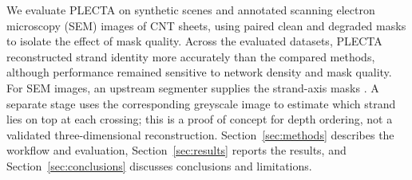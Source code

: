 We evaluate PLECTA on synthetic scenes and annotated scanning electron
microscopy (SEM) images of CNT sheets, using paired clean and degraded masks
to isolate the effect of mask quality. Across the evaluated datasets, PLECTA
reconstructed strand identity more accurately than the compared methods,
although performance remained sensitive to network density and mask quality.
For SEM images, an upstream segmenter supplies the strand-axis masks
\citep{ruehle2021workflow}. A separate stage uses the corresponding greyscale
image to estimate which strand lies on top at each crossing; this is a proof
of concept for depth ordering, not a validated three-dimensional
reconstruction. Section~\ref{sec:methods} describes the workflow and evaluation,
Section~\ref{sec:results} reports the results, and
Section~\ref{sec:conclusions} discusses conclusions and limitations.
